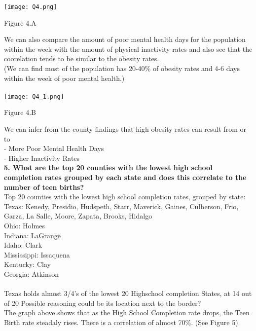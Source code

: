 \documentclass[conference]{IEEEtran}
\begin{document}
\texttt{[image: Q4.png]}
\begin{center}
\footnotesize{Figure 4.A}
\end{center}

We can also compare the amount of poor mental health days for the population within the week with the amount of physical inactivity rates and also see that the coorelation tends to be similar to the obesity rates.\\
(We can find most of the population has 20-40\% of obesity rates and 4-6 days within the week of poor mental health.)\\\\

\texttt{[image: Q4\_1.png]}
\begin{center}
\footnotesize{Figure 4.B}
\end{center}

We can infer from the county findings that high obesity rates
can result from or to\\
- More Poor Mental Health Days\\
- Higher Inactivity Rates\\


\textbf{5. What are the top 20 counties with the lowest high school completion rates grouped by each state and does this correlate to the number of teen births?}\\

 Top 20 counties with the lowest high school completion rates, grouped by state:\\
 Texas: Kenedy, Presidio, Hudspeth, Starr, Maverick, Gaines, Culberson, Frio, Garza, La Salle, Moore, Zapata, Brooks, Hidalgo\\
 Ohio: Holmes\\
 Indiana: LaGrange\\
 Idaho: Clark\\
 Mississippi: Issaquena\\
 Kentucky: Clay\\
 Georgia: Atkinson\\
 \\Texas holds almost 3/4's of the lowest 20 Highschool completion States, at 14 out of 20
 Possible reasoning could be its location next to the border?\\
 The graph above shows that as the High School Completion rate drops, the Teen Birth rate
 steadaly rises. There is a correlation of almost 70\%. (See Figure 5)\\
\end{document}
